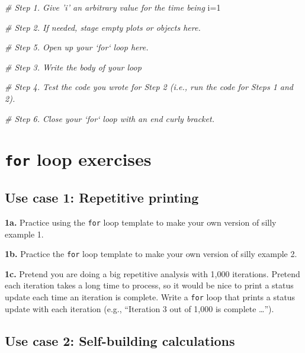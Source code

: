 \documentclass[]{book}
\newenvironment{Shaded}{\begin{snugshade}}{\end{snugshade}}
\newcommand{\CommentTok}[1]{\textcolor[rgb]{0.56,0.35,0.01}{\textit{#1}}}
\newcommand{\DecValTok}[1]{\textcolor[rgb]{0.00,0.00,0.81}{#1}}
\newcommand{\NormalTok}[1]{#1}
\begin{document}
\begin{Shaded}
\begin{Highlighting}[]
\CommentTok{# Step 1. Give 'i' an arbitrary value for the time being}
\NormalTok{i=}\DecValTok{1} 

\CommentTok{# Step 2. If needed, stage empty plots or objects here.}


\CommentTok{# Step 5. Open up your `for` loop here.}


\CommentTok{# Step 3. Write the body of your loop}


\CommentTok{# Step 4. Test the code you wrote for Step 2 (i.e., run the code for Steps 1 and 2).}


\CommentTok{# Step 6. Close your `for` loop with an end curly bracket.}
\end{Highlighting}
\end{Shaded}

\hypertarget{for-loop-exercises}{%
\section*{\texorpdfstring{\texttt{for} loop exercises}{for loop exercises}}\label{for-loop-exercises}}

\hypertarget{use-case-1-repetitive-printing}{%
\subsection*{Use case 1: Repetitive printing}\label{use-case-1-repetitive-printing}}

\textbf{1a.} Practice using the \texttt{for} loop template to make your own version of silly example 1.

\textbf{1b.} Practice the \texttt{for} loop template to make your own version of silly example 2.

\textbf{1c.} Pretend you are doing a big repetitive analysis with 1,000 iterations. Pretend each iteration takes a long time to process, so it would be nice to print a status update each time an iteration is complete. Write a \texttt{for} loop that prints a status update with each iteration (e.g., ``Iteration 3 out of 1,000 is complete \ldots{}'').

\hypertarget{use-case-2-self-building-calculations}{%
\subsection*{Use case 2: Self-building calculations}\label{use-case-2-self-building-calculations}}
\end{document}

